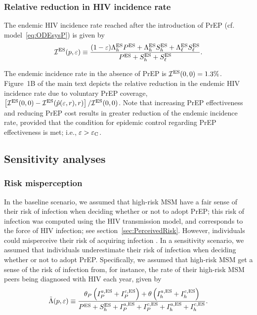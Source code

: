 \documentclass[11pt]{article}
\begin{document}
 
\subsubsection{Relative reduction in HIV incidence rate}

The endemic HIV incidence rate reached after the introduction of PrEP (cf. model~\eqref{eq:ODEsysP}) is given by
\begin{equation}
	\mathcal{I}^{\rm ES}(p, \varepsilon) \equiv \frac{(1-\varepsilon) \Lambda_h^{\rm ES} P^{\rm ES} + \Lambda_h^{\rm ES} S_h^{\rm ES} + \Lambda_\ell^{\rm ES} S_\ell^{\rm ES}}{P^{\rm ES} + S_h^{\rm ES} + S_\ell^{\rm ES}}.
\end{equation}

The endemic incidence rate in the absence of PrEP is $\mathcal{I}^{\rm ES}(0, 0) = 1.3\%$. Figure~1B of the main text depicts the relative reduction in the endemic HIV incidence rate due to voluntary PrEP coverage, $ \left[\mathcal{I}^{\rm ES}(0, 0) - \mathcal{I}^{\rm ES}(\hat{p}(\varepsilon,r),r) \right]/\mathcal{I}^{\rm ES}(0, 0)$. Note that increasing PrEP effectiveness and reducing PrEP cost results in greater reduction of the endemic incidence rate, provided that the condition for epidemic control regarding PrEP effectiveness is met; i.e., $\varepsilon > \varepsilon_{\rm C}$.


\subsection{Sensitivity analyses}
\subsubsection{Risk misperception}

In the baseline scenario, we assumed that high-risk MSM have a fair sense of their risk of infection when deciding whether or not to adopt PrEP; this risk of infection was computed using the HIV transmission model, and corresponds to the force of HIV infection; see section~\ref{sec:PerceivedRisk}. However, individuals could misperceive their risk of acquiring infection \cite{Blumenthal2019}.  In a sensitivity scenario, we assumed that individuals underestimate their risk of infection when deciding whether or not to adopt PrEP. Specifically, we assumed that high-risk MSM get a sense of the risk of infection from, for instance, the rate of their high-risk MSM peers being diagnosed with HIV each year, given by
\begin{equation}
	\tilde{\Lambda} (p, \varepsilon) \equiv \frac{\theta_P \left(I_P^{a,\rm ES} + I_P^{c,\rm ES}\right) + \theta \left(I_h^{a,\rm ES} + I_h^{c,\rm ES}\right)}{P^{\rm ES} + S_h^{\rm ES} + I_P^{a,\rm ES} + I_P^{c,\rm ES} + I_h^{a,\rm ES} + I_h^{c,\rm ES}} .
\end{equation}
\end{document}
